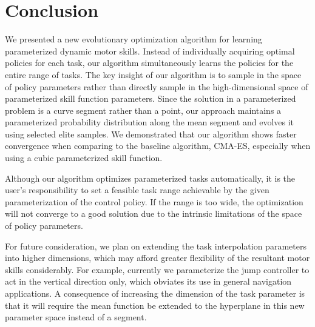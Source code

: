 \section{Conclusion} 
\label{sec:optskills_conclusion}

We presented a new evolutionary optimization algorithm for
  learning parameterized dynamic motor skills.
  Instead of individually acquiring optimal policies for each task,
  our algorithm simultaneously learns the policies for the entire range of
  tasks.
  The key insight of our algorithm is to sample in the space of policy
  parameters rather than directly sample in the high-dimensional space
  of parameterized skill function parameters. Since the solution in
  a parameterized problem is a curve segment rather than a point,
  our approach maintains a parameterized probability distribution along the
  mean segment and evolves it using selected elite samples.
  We demonstrated that our algorithm shows faster convergence when
  comparing to the baseline algorithm, CMA-ES, especially when using a
  cubic parameterized skill function.

  Although our algorithm optimizes parameterized tasks automatically, it is the user's
  responsibility to set a feasible task range achievable by the given
  parameterization of the control policy. If the range is too wide,
  the optimization will not converge to a good solution due to the
  intrinsic limitations of the space of policy parameters. 

  For future consideration, we plan on extending the task
  interpolation parameters into higher dimensions, which may afford
  greater flexibility of the resultant motor skills considerably.  For
  example, currently we parameterize the jump controller to act in the
  vertical direction only, which obviates its use in general
  navigation applications. A consequence of increasing the dimension
  of the task parameter is that it will require the mean function be
  extended to the hyperplane in this new parameter space instead of a
  segment.

